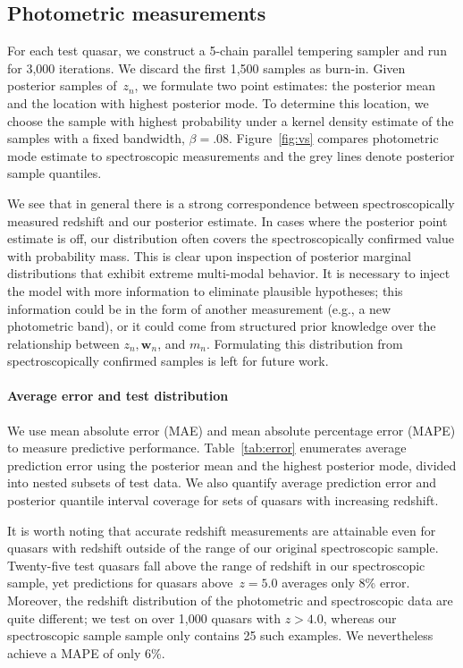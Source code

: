 \documentclass{article}
\begin{document}
\subsection{Photometric measurements}
For each test quasar, we construct a 5-chain parallel tempering sampler and run for 3,000 iterations.
We discard the first 1,500 samples as burn-in. 
Given posterior samples of~$z_n$, we formulate two point estimates: the posterior mean and the location with highest posterior mode.
To determine this location, we choose the sample with highest probability under a kernel density estimate of the samples with a fixed bandwidth, ${\beta = .08}$.  
Figure~\ref{fig:vs} compares photometric mode estimate to spectroscopic measurements and the grey lines denote posterior sample quantiles. 

We see that in general there is a strong correspondence between spectroscopically measured redshift and our posterior estimate.
In cases where the posterior point estimate is off, our distribution often covers the spectroscopically confirmed value with probability mass.
This is clear upon inspection of posterior marginal distributions that exhibit extreme multi-modal behavior.  
It is necessary to inject the model with more information to eliminate plausible hypotheses; this information could be in the form of another measurement (e.g., a new photometric band), or it could come from structured prior knowledge over the relationship between $z_n, \mathbf{w}_n$, and $m_n$.
Formulating this distribution from spectroscopically confirmed samples is left for future work.  

\paragraph{Average error and test distribution}
We use mean absolute error (MAE) and mean absolute percentage error (MAPE) to measure predictive performance.  
Table~\ref{tab:error} enumerates average prediction error using the posterior mean and the highest posterior mode, divided into nested subsets of test data.  
We also quantify average prediction error and posterior quantile interval coverage for sets of quasars with increasing redshift.  

It is worth noting that accurate redshift measurements are attainable even for quasars with redshift outside of the range of our original spectroscopic sample.
Twenty-five test quasars fall above the range of redshift in our spectroscopic sample, yet predictions for quasars above~${z=5.0}$ averages only 8\% error.  
Moreover, the redshift distribution of the photometric and spectroscopic data are quite different; we test on over 1,000 quasars with ${z > 4.0}$, whereas our spectroscopic sample sample only contains 25 such examples.
We nevertheless achieve a MAPE of only 6\%.  
\end{document}

